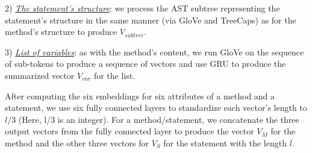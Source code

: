 



2) {\em \underline{The statement's structure}}: we process the AST
subtree representing the statement's structure in the same manner (via
GloVe and TreeCaps) as for the method's structure to produce
$V_{subtree}$.



3) {\em \underline{List of variables}}: as with the method's content,
we run GloVe on the sequence of sub-tokens to produce a sequence of
vectors and use GRU to produce the summarized vector $V_{var}$ for the
list.





After computing the six embeddings for six attributes of a method and
a statement, we use six fully connected layers to standardize each
vector's length to $l/3$ (Here, l/3 is an integer). For a
method/statement, we concatenate the three output vectors from the
fully connected layer to produce the vector $V_{M}$ for the method and
the other three vectors for $V_{S}$ for the statement with the length
$l$.

